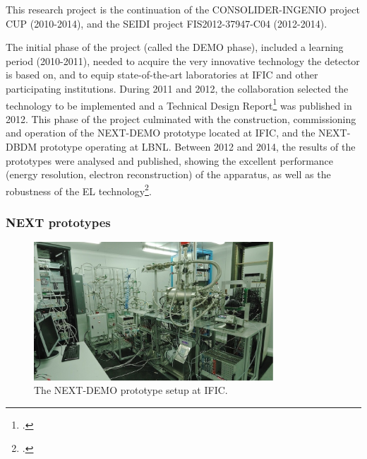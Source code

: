 
%

This research project is the continuation of the CONSOLIDER-INGENIO project CUP (2010-2014), and the SEIDI project FIS2012-37947-C04 (2012-2014). 

The initial phase of the project (called the DEMO phase), included a learning period (2010-2011), needed to acquire the very innovative technology the detector is based on, and to equip state-of-the-art laboratories at IFIC and other participating institutions. 
During 2011 and 2012, the collaboration selected the technology to be implemented and a Technical Design Report\footcite{Alvarez:2012haa} was published in 2012. This phase of the project culminated  with the construction, commissioning and operation of the NEXT-DEMO prototype located at IFIC, and the NEXT-DBDM prototype operating at LBNL. Between 2012 and 2014, the results of the prototypes were analysed and published, showing the excellent performance (energy resolution, electron reconstruction) of the apparatus, as well as the robustness of the EL technology\footcite{Alvarez:2012hh, Alvarez:2012nd, Alvarez:2012hu,Alvarez:2013gxa,Lorca:2014sra}. 

\subsubsection*{NEXT prototypes}

\begin{figure}
\centering
\includegraphics[width=0.8\textwidth]{img/DemoSetup.jpg}
\caption{\small The NEXT-DEMO prototype setup at IFIC.} \label{fig.DEMO}
\end{figure}

